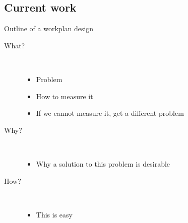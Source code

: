 \documentclass[hyperref={colorlinks=true}]{beamer}
\begin{document}
\subsection{Current work}
\begin{frame}{Outline of a workplan design}
\begin{description}
  \item[What?] \hfill \\
  \begin{itemize}
    \item Problem
    \item How to measure it
    \item If we cannot measure it, get a different problem
  \end{itemize}
  \pause
  \item[Why?] \hfill \\
  \begin{itemize}
    \item Why a solution to this problem is desirable
  \end{itemize}
  \item[How?] \hfill \\
  \begin{itemize}
    \item This is easy
  \end{itemize}
\end{description}
\end{frame}
\end{document}
